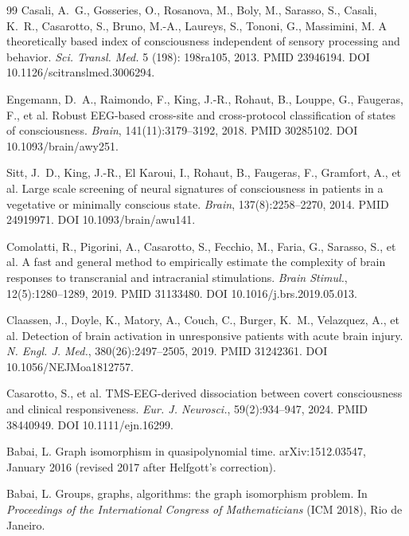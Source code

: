 \documentclass[11pt,a4paper]{amsart}
\theoremstyle{plain}
\theoremstyle{definition}
\begin{document}
\begin{thebibliography}{99}
Casali, A.~G., Gosseries, O., Rosanova, M., Boly, M., Sarasso, S., Casali, K.~R., Casarotto, S., Bruno, M.-A., Laureys, S., Tononi, G., Massimini, M.
\newblock A theoretically based index of consciousness independent of sensory processing and behavior.
\newblock \emph{Sci. Transl. Med.} 5 (198): 198ra105, 2013. PMID 23946194. DOI 10.1126/scitranslmed.3006294.

Engemann, D.~A., Raimondo, F., King, J.-R., Rohaut, B., Louppe, G., Faugeras, F., et al.
\newblock Robust EEG-based cross-site and cross-protocol classification of states of consciousness.
\newblock \emph{Brain}, 141(11):3179--3192, 2018. PMID 30285102. DOI 10.1093/brain/awy251.

Sitt, J.~D., King, J.-R., El Karoui, I., Rohaut, B., Faugeras, F., Gramfort, A., et al.
\newblock Large scale screening of neural signatures of consciousness in patients in a vegetative or minimally conscious state.
\newblock \emph{Brain}, 137(8):2258--2270, 2014. PMID 24919971. DOI 10.1093/brain/awu141.

Comolatti, R., Pigorini, A., Casarotto, S., Fecchio, M., Faria, G., Sarasso, S., et al.
\newblock A fast and general method to empirically estimate the complexity of brain responses to transcranial and intracranial stimulations.
\newblock \emph{Brain Stimul.}, 12(5):1280--1289, 2019. PMID 31133480. DOI 10.1016/j.brs.2019.05.013.

Claassen, J., Doyle, K., Matory, A., Couch, C., Burger, K.~M., Velazquez, A., et al.
\newblock Detection of brain activation in unresponsive patients with acute brain injury.
\newblock \emph{N. Engl. J. Med.}, 380(26):2497--2505, 2019. PMID 31242361. DOI 10.1056/NEJMoa1812757.

Casarotto, S., et al.
\newblock TMS-EEG-derived dissociation between covert consciousness and clinical responsiveness.
\newblock \emph{Eur. J. Neurosci.}, 59(2):934--947, 2024. PMID 38440949. DOI 10.1111/ejn.16299.

Babai, L.
\newblock Graph isomorphism in quasipolynomial time.
\newblock arXiv:1512.03547, January 2016 (revised 2017 after Helfgott's correction).

Babai, L.
\newblock Groups, graphs, algorithms: the graph isomorphism problem.
\newblock In \emph{Proceedings of the International Congress of Mathematicians} (ICM 2018), Rio de Janeiro.


\end{thebibliography}
\end{document}
